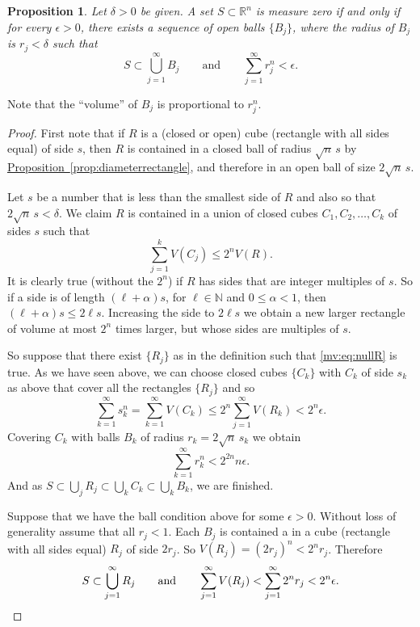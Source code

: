 \documentclass[12pt]{book}
\newcommand{\R}{{\mathbb{R}}}
\newcommand{\N}{{\mathbb{N}}}
\theoremstyle{plain}
\newtheorem{prop}[thm]{Proposition}
\theoremstyle{remark}
\theoremstyle{definition}
\theoremstyle{exercise}
\theoremstyle{example}
\newcommand{\propref}[1]{\hyperref[#1]{Proposition~\ref*{#1}}}
\begin{document}
\begin{prop} \label{mv:prop:ballsnull}
Let $\delta > 0$ be given.
A set $S \subset \R^n$ is measure zero if and only if for every $\epsilon >
0$, there exists a sequence of open balls $\{ B_j \}$, where the radius of
$B_j$ is $r_j < \delta$ such that
\begin{equation*}
S \subset \bigcup_{j=1}^\infty B_j \qquad \text{and} \qquad
\sum_{j=1}^\infty r_j^n < \epsilon.
\end{equation*}
\end{prop}

Note that the ``volume'' of $B_j$ is proportional to $r_j^n$.

\begin{proof}
First note that if $R$ is a (closed or open) cube (rectangle with all sides
equal) of side $s$, then $R$ is contained in a closed ball of radius
$\sqrt{n}\, s$ by \propref{prop:diameterrectangle}, and therefore
in an open ball of size $2 \sqrt{n}\, s$.

Let $s$ be a number that is less than the smallest side of $R$ and also
so that $2\sqrt{n} \, s < \delta$.
We claim $R$ is contained in
a union of closed cubes $C_1, C_2, \ldots, C_k$ of sides $s$ such that
\begin{equation*}
\sum_{j=1}^k V(C_j) \leq 2^n V(R) .
\end{equation*}
It is clearly true (without the $2^n$) if $R$ has sides that are
integer multiples of $s$.  So if a side is of length $(\ell+\alpha) s$, for
$\ell \in \N$ and $0 \leq \alpha < 1$, then
$(\ell+\alpha)s \leq 2\ell s$.  Increasing the side to $2\ell s$ we obtain a new larger
rectangle of volume at most $2^n$ times larger, but whose sides are
multiples of $s$.

So suppose that there exist $\{ R_j \}$ as in the definition such that
\eqref{mv:eq:nullR} is true.  As we have seen above, we can choose closed
cubes $\{ C_k \}$ with $C_k$ of side $s_k$ as above that cover all the rectangles $\{ R_j \}$
and so
\begin{equation*}
\sum_{k=1}^\infty s_k^n =
\sum_{k=1}^\infty V(C_k) \leq
2^n \sum_{j=1}^\infty V(R_k)
< 2^n \epsilon.
\end{equation*}
Covering $C_k$ with balls $B_k$ of radius $r_k = 2\sqrt{n} \, s_k$ we obtain 
\begin{equation*}
\sum_{k=1}^\infty r_k^n <
2^{2n} n \epsilon .
\end{equation*}
And as $S \subset\bigcup_{j} R_j \subset \bigcup_{k} C_k \subset \bigcup_{k}
B_k$, we are finished.

Suppose that we have the ball condition above for some $\epsilon > 0$.
Without loss of generality assume that all $r_j < 1$.
Each $B_j$ is contained a in a cube (rectangle with all sides equal) $R_j$ of side $2r_j$.
So $V(R_j) = {(2 r_j)}^n < 2^n r_j$.  Therefore 
\begin{equation*}
S \subset \bigcup_{j=1}^\infty R_j \qquad \text{and} \qquad
\sum_{j=1}^\infty V(R_j)
<
\sum_{j=1}^\infty 2^n r_j < 2^n \epsilon. \qedhere
\end{equation*}
\end{proof}
\end{document}
